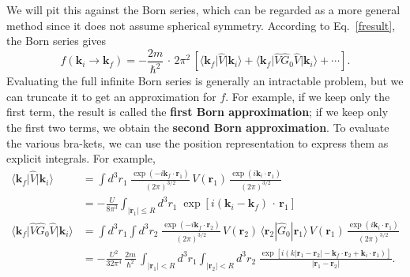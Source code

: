 \documentclass[prx,12pt]{revtex4-2}
\begin{document}
We will pit this against the Born series, which can be regarded as a
more general method since it does not assume spherical symmetry.
According to Eq.~\eqref{fresult}, the Born series gives
\begin{equation}
  f(\mathbf{k}_i\rightarrow \mathbf{k}_f) = - \frac{2m}{\hbar^2} \,\cdot \, 2\pi^2 \, \left[\big\langle \mathbf{k}_f\big| \hat{V}|\mathbf{k}_i\big\rangle + \big\langle \mathbf{k}_f \big| \hat{V}\hat{G}_0 \hat{V} \big|\mathbf{k}_i\big\rangle + \cdots \right].
  \label{fexpression}
\end{equation}
Evaluating the full infinite Born series is generally an intractable
problem, but we can truncate it to get an approximation for $f$.  For
example, if we keep only the first term, the result is called the
\textbf{first Born approximation}; if we keep only the first two
terms, we obtain the \textbf{second Born approximation}.  To evaluate
the various bra-kets, we can use the position representation to
express them as explicit integrals.  For example,
\begin{align}
  \big\langle \mathbf{k}_f\big| \hat{V}|\mathbf{k}_i\big\rangle
  &= \int d^3r_1\; \frac{\exp(-i\mathbf{k}_f \cdot \mathbf{r}_1)}{(2\pi)^{3/2}} \, V(\mathbf{r}_1) \, \frac{\exp(i\mathbf{k}_i \cdot \mathbf{r}_1)}{(2\pi)^{3/2}}
  \nonumber \\
  &= - \frac{U}{8\pi^3} \int_{|\mathbf{r}_1| \le R} d^3r_1 \; \exp\left[i(\mathbf{k}_i-\mathbf{k}_f)\, \cdot\, \mathbf{r}_1\right] \label{singleint}\\
  \big\langle \mathbf{k}_f \big| \hat{V}\hat{G}_0 \hat{V} \big|\mathbf{k}_i\big\rangle &=
  \int d^3r_1 \!\! \int d^3r_2 \; \frac{\exp(-i\mathbf{k}_f \cdot \mathbf{r}_2)}{(2\pi)^{3/2}} \, V(\mathbf{r}_2) \, \langle\mathbf{r}_2|\hat{G}_0|\mathbf{r}_1 \rangle \, V(\mathbf{r}_1)\, \frac{\exp(i\mathbf{k}_i \cdot \mathbf{r}_1)}{(2\pi)^{3/2}} \nonumber \\
  &= - \frac{U^2}{32\pi^4} \, \frac{2m}{\hbar^2}\, \int_{|\mathbf{r}_1|<R} d^3 r_1 \int_{|\mathbf{r}_2|<R} d^3 r_2 \; \frac{\exp\left[i(k|\mathbf{r}_1-\mathbf{r}_2| - \mathbf{k}_f \cdot \mathbf{r}_2 +\mathbf{k}_i \cdot \mathbf{r}_1)\right]}{|\mathbf{r}_1-\mathbf{r}_2|}.
  \label{doubleint}
\end{align}
\end{document}
